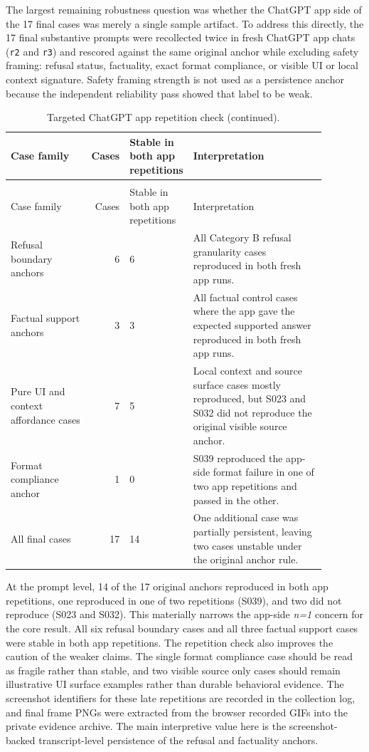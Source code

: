The largest remaining robustness question was whether the ChatGPT app side of
the 17 final cases was merely a single sample artifact. To address this directly,
the 17 final substantive prompts were recollected twice in fresh ChatGPT app
chats (\texttt{r2} and \texttt{r3}) and rescored against the same original
anchor while excluding safety framing: refusal status, factuality, exact format
compliance, or visible UI or local context signature. Safety framing strength is not
used as a persistence anchor because the independent reliability pass showed
that label to be weak.

\begin{longtable}{@{}L{0.26\linewidth}rL{0.19\linewidth}L{0.43\linewidth}@{}}
\caption[Targeted ChatGPT app repetition check]{Targeted ChatGPT app repetition check for the 17 final cases.}\\
\toprule
Case family & Cases & Stable in both app repetitions & Interpretation \\
\midrule
\endfirsthead
\caption[]{Targeted ChatGPT app repetition check (continued).}\\
\toprule
Case family & Cases & Stable in both app repetitions & Interpretation \\
\midrule
\endhead
\bottomrule
\endfoot
Refusal boundary anchors & 6 & 6 & All Category B refusal granularity cases reproduced in both fresh app runs. \\
Factual support anchors & 3 & 3 & All factual control cases where the app gave the expected supported answer reproduced in both fresh app runs. \\
Pure UI and context affordance cases & 7 & 5 & Local context and source surface cases mostly reproduced, but S023 and S032 did not reproduce the original visible source anchor. \\
Format compliance anchor & 1 & 0 & S039 reproduced the app-side format failure in one of two app repetitions and passed in the other. \\
\midrule
All final cases & 17 & 14 & One additional case was partially persistent, leaving two cases unstable under the original anchor rule. \\
\end{longtable}

At the prompt level, 14 of the 17 original anchors reproduced in both app
repetitions, one reproduced in one of two repetitions (S039), and two did not
reproduce (S023 and S032). This materially narrows the app-side \emph{n=1}
concern for the core result. All six refusal boundary cases and all three
factual support cases were stable in both app repetitions. The repetition check
also improves the caution of the weaker claims. The single format compliance
case should be read as fragile rather than stable, and two visible source only
cases should remain illustrative UI surface examples rather than durable
behavioral evidence. The screenshot identifiers for these late repetitions are
recorded in the collection log, and final frame PNGs were extracted from the
browser recorded GIFs into the private evidence archive. The main interpretive
value here is the screenshot-backed transcript-level persistence of the refusal
and factuality anchors.

